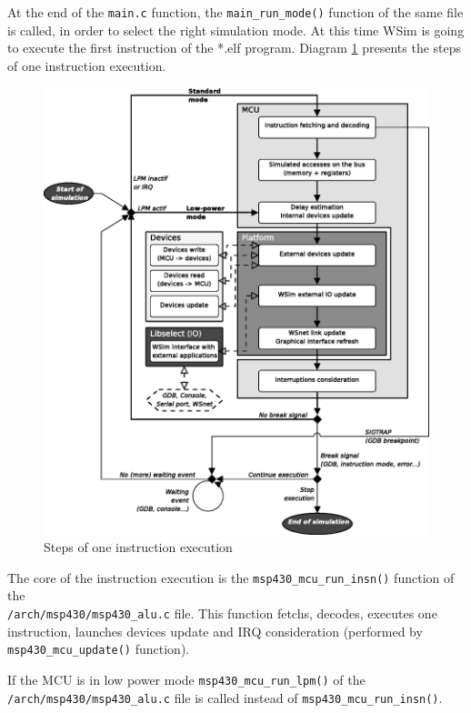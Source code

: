 \documentclass[a4paper,10pt]{report}
\begin{document}
At the end of the \verb$main.c$ function, the  \verb$main_run_mode()$ function of the same file is called, in order to select the right simulation mode. At this time WSim is going to execute the first instruction of the *.elf program. Diagram \ref{wsim-instruction} presents the steps of one instruction execution.

\begin{figure}[ht]
\begin{center}
  \includegraphics[scale=0.8]{figures/wsim_diag_execution.eps}
\end{center}
\caption{Steps of one instruction execution}
\label{wsim-instruction}
\end{figure}

The core of the instruction execution is the \verb$msp430_mcu_run_insn()$ function of the\\ \verb$/arch/msp430/msp430_alu.c$ file. This function fetchs, decodes, executes one instruction, launches devices update and IRQ consideration (performed by \verb$msp430_mcu_update()$ function).

If the MCU is in low power mode \verb$msp430_mcu_run_lpm()$ of the \verb$/arch/msp430/msp430_alu.c$ file is called instead of \verb$msp430_mcu_run_insn()$.\\
\end{document}
